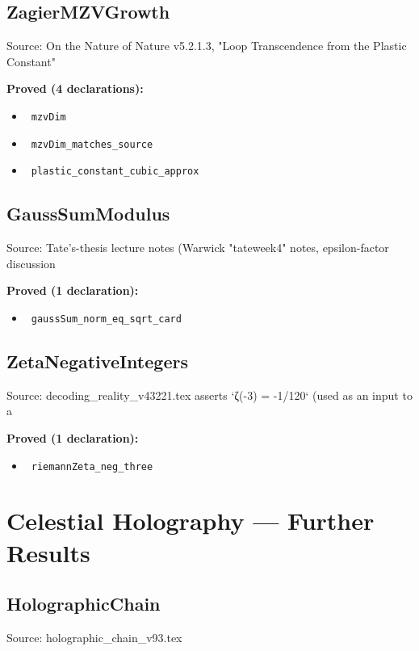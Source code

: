 \documentclass{report}
\theoremstyle{definition}
\begin{document}
\begin{itemize}
\begin{itemize}
\subsection{ZagierMZVGrowth}
Source: On the Nature of Nature v5.2.1.3, "Loop Transcendence from the Plastic Constant"

\noindent\textbf{Proved (4 declarations):}
\begin{itemize}
  \item {}\leanok\ \texttt{mzvDim}
  \item {}\leanok\ \texttt{mzvDim\_matches\_source}
  \item {}\leanok\ \texttt{plastic\_constant\_cubic\_approx}
\end{itemize}

\subsection{GaussSumModulus}
Source: Tate's-thesis lecture notes (Warwick "tateweek4" notes, epsilon-factor discussion

\noindent\textbf{Proved (1 declaration):}
\begin{itemize}
  \item {}\leanok\ \texttt{gaussSum\_norm\_eq\_sqrt\_card}
\end{itemize}

\subsection{ZetaNegativeIntegers}
Source: decoding\_reality\_v43221.tex asserts `ζ(-3) = -1/120` (used as an input to a

\noindent\textbf{Proved (1 declaration):}
\begin{itemize}
  \item {}\leanok\ \texttt{riemannZeta\_neg\_three}
\end{itemize}

\section{Celestial Holography --- Further Results}

\subsection{HolographicChain}
Source: holographic\_chain\_v93.tex


\end{itemize}
\end{itemize}
\end{document}
